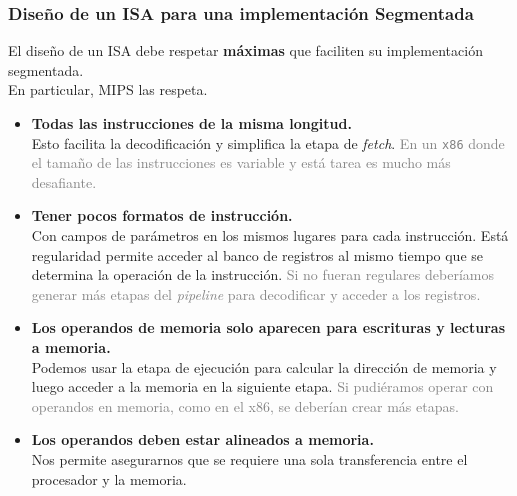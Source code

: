 \documentclass[aspectratio=169]{beamer}
\begin{document}
\begin{frame}[t,fragile]
    \frametitle{Diseño de un ISA para una implementación Segmentada}
    \small
    El diseño de un ISA debe respetar \textbf{máximas} que faciliten su implementación segmentada.\\
    \textcolor{verdeuca}{En particular, MIPS las respeta.}
    \begin{itemize}
    \item<2-> \textcolor{naranjauca}{\textbf{Todas las instrucciones de la misma longitud.}}\\
    Esto facilita la decodificación y simplifica la etapa de \emph{fetch}.
    \textcolor{gray}{En un \texttt{x86} donde el tamaño de las instrucciones es variable y está tarea es mucho más desafiante.}
    \item<3-> \textcolor{naranjauca}{\textbf{Tener pocos formatos de instrucción.}}\\
    Con campos de parámetros en los mismos lugares para cada instrucción.
    Está regularidad permite acceder al banco de registros al mismo tiempo que se determina la operación de la instrucción.
    \textcolor{gray}{Si no fueran regulares deberíamos generar más etapas del \emph{pipeline} para decodificar y acceder a los registros.}
    \item<4-> \textcolor{naranjauca}{\textbf{Los operandos de memoria solo aparecen para escrituras y lecturas a memoria.}}\\
    Podemos usar la etapa de ejecución para calcular la dirección de memoria y luego acceder a la memoria en la siguiente etapa.
    \textcolor{gray}{Si pudiéramos operar con operandos en memoria, como en el x86, se deberían crear más etapas.}
    \item<5-> \textcolor{naranjauca}{\textbf{Los operandos deben estar alineados a memoria.}}\\
    Nos permite asegurarnos que se requiere una sola transferencia entre el procesador y la memoria.
    \end{itemize}
\end{frame}
\end{document}
